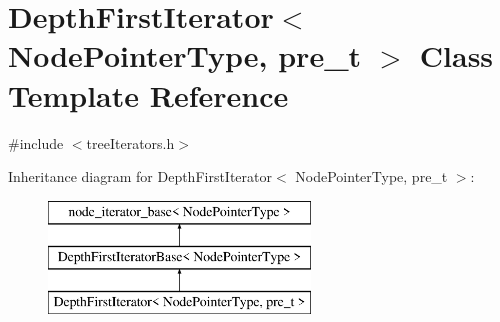 \hypertarget{classDepthFirstIterator}{}\section{Depth\+First\+Iterator$<$ Node\+Pointer\+Type, pre\+\_\+t $>$ Class Template Reference}
\label{classDepthFirstIterator}


{\ttfamily \#include $<$tree\+Iterators.\+h$>$}

Inheritance diagram for Depth\+First\+Iterator$<$ Node\+Pointer\+Type, pre\+\_\+t $>$\+:\begin{figure}[H]
\begin{center}
\leavevmode
\includegraphics[height=3.000000cm]{classDepthFirstIterator}
\end{center}
\end{figure}
